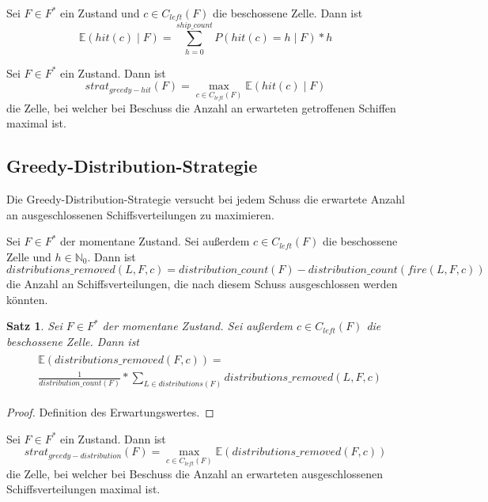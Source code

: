 \documentclass[a4paper,12pt]{llncs}
\newcommand{\N}{{\mathbb{N}}}
\numberwithin{equation}{section}
\newtheorem{satz}{Satz}
\begin{document}
\begin{definition}
Sei $F\in F^*$ ein Zustand und $c \in C_{left}(F)$ die beschossene Zelle.
Dann ist
\[
\mathds{E}(hit(c) \mid F)=\sum_{h=0}^{ship\_count} P(hit(c)=h \mid F) * h
\]
\end{definition}

\begin{definition}
Sei $F\in F^*$ ein Zustand.
Dann ist
\[
strat_{greedy-hit}(F)=\max_{c \in C_{left}(F)} \mathds{E}(hit(c) \mid F)
\]
die Zelle, bei welcher bei Beschuss die Anzahl an erwarteten getroffenen Schiffen maximal ist.
\end{definition}

\subsection{Greedy-Distribution-Strategie}
Die Greedy-Distribution-Strategie versucht bei jedem Schuss die erwartete Anzahl an ausgeschlossenen Schiffsverteilungen zu maximieren.

\begin{definition}
Sei $F\in F^*$ der momentane Zustand.
Sei außerdem $c \in C_{left}(F)$ die beschossene Zelle und $h \in \N_0$.
Dann ist
\[
distributions\_removed(L, F, c)=distribution\_count(F) - distribution\_count(fire(L, F,c))
\]
die Anzahl an Schiffsverteilungen, die nach diesem Schuss ausgeschlossen werden könnten.
\end{definition}

\begin{satz}
Sei $F\in F^*$ der momentane Zustand.
Sei außerdem $c \in C_{left}(F)$ die beschossene Zelle.
Dann ist
\begin{align}
\begin{split}
&\mathds{E}(distributions\_removed(F,c))=\\
&\frac{1}{distribution\_count(F)} * \sum_{L \in distributions(F)} distributions\_removed(L, F, c) \nonumber
\end{split}
\end{align}
\end{satz}

\begin{proof}
Definition des Erwartungswertes.
\end{proof}

\begin{definition}
Sei $F\in F^*$ ein Zustand.
Dann ist
\[
strat_{greedy-distribution}(F)=\max_{c \in C_{left}(F)} \mathds{E}(distributions\_removed(F,c))
\]
die Zelle, bei welcher bei Beschuss die Anzahl an erwarteten ausgeschlossenen Schiffsverteilungen maximal ist.
\end{definition}
\end{document}
